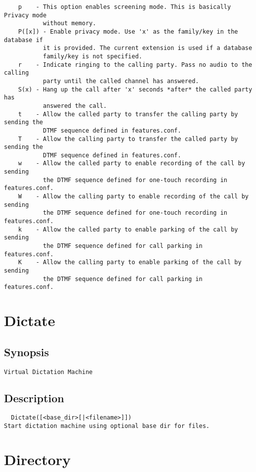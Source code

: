 \begin{verbatim}
    p    - This option enables screening mode. This is basically Privacy mode
           without memory.
    P([x]) - Enable privacy mode. Use 'x' as the family/key in the database if
           it is provided. The current extension is used if a database
           family/key is not specified.
    r    - Indicate ringing to the calling party. Pass no audio to the calling
           party until the called channel has answered.
    S(x) - Hang up the call after 'x' seconds *after* the called party has
           answered the call.
    t    - Allow the called party to transfer the calling party by sending the
           DTMF sequence defined in features.conf.
    T    - Allow the calling party to transfer the called party by sending the
           DTMF sequence defined in features.conf.
    w    - Allow the called party to enable recording of the call by sending
           the DTMF sequence defined for one-touch recording in features.conf.
    W    - Allow the calling party to enable recording of the call by sending
           the DTMF sequence defined for one-touch recording in features.conf.
    k    - Allow the called party to enable parking of the call by sending
           the DTMF sequence defined for call parking in features.conf.
    K    - Allow the calling party to enable parking of the call by sending
           the DTMF sequence defined for call parking in features.conf.

\end{verbatim}


\section{Dictate}
\subsection{Synopsis}
\begin{verbatim}
Virtual Dictation Machine
\end{verbatim}
\subsection{Description}
\begin{verbatim}
  Dictate([<base_dir>[|<filename>]])
Start dictation machine using optional base dir for files.

\end{verbatim}


\section{Directory}
